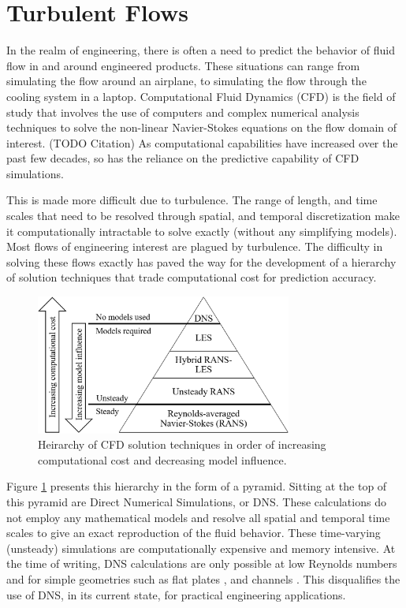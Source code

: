 \section{Turbulent Flows}

In the realm of engineering, there is often a need to predict the behavior of fluid flow in and around engineered products. These situations can range from simulating the flow around an airplane, to simulating the flow through the cooling system in a laptop. Computational Fluid Dynamics (CFD) is the field of study that involves the use of computers and complex numerical analysis techniques to solve the non-linear Navier-Stokes equations on the flow domain of interest. (TODO Citation) As computational capabilities have increased over the past few decades, so has the reliance on the predictive capability of CFD simulations. 

This is made more difficult due to turbulence. The range of length, and time scales that need to be resolved through spatial, and temporal discretization make it computationally intractable to solve exactly (without any simplifying models). Most flows of engineering interest are plagued by turbulence. The difficulty in solving these flows exactly has paved the way for the development of a hierarchy of solution techniques that trade computational cost for prediction accuracy. 

\begin{figure}
    \center
    \includegraphics[width=0.75\textwidth]{suthesis/images/solution_heirarchy_simple.png}
    \caption{Heirarchy of CFD solution techniques in order of increasing computational cost and decreasing model influence. \label{fig:cfd_types}}
\end{figure}

Figure \ref{fig:cfd_types} presents this hierarchy in the form of a pyramid. Sitting at the top of this pyramid are Direct Numerical Simulations, or DNS. These calculations do not employ any mathematical models and resolve all spatial and temporal time scales to give an exact reproduction of the fluid behavior. These time-varying (unsteady) simulations are computationally expensive and memory intensive. At the time of writing, DNS calculations are only possible at low Reynolds numbers and for simple geometries such as flat plates \cite{hoyas_reynolds_2008}, and channels \cite{laval_marquillie_dns_channel,marquillie_instability_2011}. This disqualifies the use of DNS, in its current state, for practical engineering applications. 

